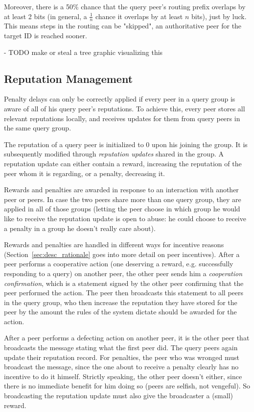 Moreover, there is a 50\% chance that the query peer's routing prefix overlaps
by at least 2 bits (in general, a $\frac{1}{n}$ chance it overlaps by at least
$n$ bits), just by luck. This means steps in the routing can be "skipped", an
authoritative peer for the target ID is reached sooner.

- TODO make or steal a tree graphic visualizing this

\subsection{Reputation Management}
\label{sec:desc_rep_management}
Penalty delays can only be correctly applied if every peer in a query group is
aware of all of his query peer's reputations. To achieve this, every peer stores
all relevant reputations locally, and receives updates for them from query peers
in the same query group.

The reputation of a query peer is initialized to 0 upon his joining the group.
It is subsequently modified through \emph{reputation updates} shared in the
group. A reputation update can either contain a reward, increasing the
reputation of the peer whom it is regarding, or a penalty, decreasing it.

Rewards and penalties are awarded in response to an interaction with another
peer or peers. In case the two peers share more than one query group, they are
applied in all of those groups (letting the peer choose in which group he would
like to receive the reputation update is open to abuse: he could choose to
receive a penalty in a group he doesn't really care about).

Rewards and penalties are handled in different ways for incentive reasons
(Section~\ref{sec:desc_rationale} goes into more detail on peer incentives).
After a peer performs a cooperative action (one deserving a reward, e.g.
successfully responding to a query) on another peer, the other peer sends him a
\emph{cooperation confirmation}, which is a statement signed by the other peer
confirming that the peer performed the action. The peer then broadcasts this
statement to all peers in the query group, who then increase the reputation they
have stored for the peer by the amount the rules of the system dictate should be
awarded for the action.

After a peer performs a defecting action on another peer, it is the other peer
that broadcasts the message stating what the first peer did. The query peers
again update their reputation record. For penalties, the peer who was wronged
must broadcast the message, since the one about to receive a penalty clearly has
no incentive to do it himself. Strictly speaking, the other peer doesn't either,
since there is no immediate benefit for him doing so (peers are selfish, not
vengeful). So broadcasting the reputation update must also give the broadcaster
a (small) reward.

